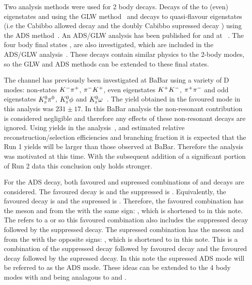 Two analysis methods were used for 2 body \D decays. Decays of the \D to \CP (even) eigenstates \Kp\Km and \pip\pim using the GLW method~\cite{GL,GW} and decays to quasi-flavour eigenstates \Kpm\pimp (i.e the Cabibbo allowed decay \decay{\Dz}{\Km\pip} and the doubly Cabibbo supressed decay \decay{\Dz}{\pim\Kp}) using the ADS method~\cite{ADS,ADS-2001}. An ADS/GLW analysis has been published for  and \decay{\Bz}{\D\Kstarz} at \lhcb~\cite{LHCb-PAPER-2016-003,LHCb-PAPER-2014-028}. The four body final states \decay{\Dz}{\Km\pip\pim\pip}, \decay{\Dz}{\pip\pim\pip\pim} \decay{\Dz}{\Kp\pim\pip\pim} are also investigated, which are included in the  ADS/GLW analysis~\cite{LHCb-PAPER-2016-003}. These \Dz decays contain similar physics to the 2-body modes, so the GLW and ADS methods can be extended to these final states.

The \decay{\Bpm}{\D\Kstarpm} channel has previously been investigated at BaBar using a variety of D modes: non-\CP states ${{K}^-}{{\pi}^+}$, ${{\pi}^-}{{K}^+}$, \CP even eigenstates ${{K}^+}{{K}^-}$, ${{\pi}^+}{{\pi}^-}$ and \CP odd eigenstates ${{K}^0_{\mathrm{ \scriptscriptstyle S}}}{{\pi}^0}$, ${{K}^0_{\mathrm{ \scriptscriptstyle S}}}\phi$ and ${{K}^0_{\mathrm{ \scriptscriptstyle S}}}\omega$~\cite{BaBarDKstar}. The yield obtained in the favoured \decay{\Dz}{\Km\pip} mode in this analysis was $231 \pm 17$. In this BaBar analysis the non-resonant \decay{\B}{\D\KS\pi} contribution is considered negligible and therefore any effects of these non-resonant decays are ignored. Using yields in the \decay{\Bpm}{\D\Kpm} analysis~\cite{LHCb-PAPER-2016-003}, and estimated relative reconstruction/selection efficiencies and branching fraction it is expected that the Run 1 yields will be larger than those observed at BaBar. Therefore the analysis was motivated at this time. With the subsequent addition of a significant portion of Run 2 data this conclusion only holds stronger.

For the ADS decay, both favoured and supressed combinations of \Bm and \Dz decays are considered. The favoured \Bm decay is \decay{\Bm}{\Dz\Kstarm} and the suppressed is \decay{\Bm}{\Dzb\Kstarm}. Equivalently, the favoured \Dz decay is \decay{\Dz}{\Km\pip} and the supressed is \decay{\Dz}{\pim\Kp}. Therefore, the favoured combination has the \B meson and \kaon from the \D with the same sign: \decay{\Bm}{\D(\Km\pip)\Kstarm(\KS\pim)}, which is shortened to \decay{\Bm}{\D(\Km\pip)\Kstarm} in this note. The \D refers to a \Dz or \Dzb so this favoured combination also includes the suppressed \B decay followed by the suppressed \D decay. The supressed combination has the \B meson and \kaon from the \D with the opposite signs: \decay{\Bm}{\D(\Kp\pim)\Kstarm(\KS\pim)}, which is shortened to \decay{\Bm}{\D(\Kp\pim)\Kstarm} in this note. This is a combination of the suppressed \D decay followed by favoured \B decay and the favoured \B decay followed by the supressed \D decay. In this note the supressed ADS mode will be referred to as the ADS mode. These ideas can be extended to the 4 body modes with \decay{\Bm}{\D(\Km\pip\pim\pip)\Kstarm(\KS\pim)} and \decay{\Bm}{\D(\Kp\pim\pip\pim)\Kstarm(\KS\pim)} being analagous to \decay{\Bm}{\D(\Km\pip)\Kstarm(\KS\pim)} and \decay{\Bm}{\D(\Kp\pim)\Kstarm(\KS\pim)}.

